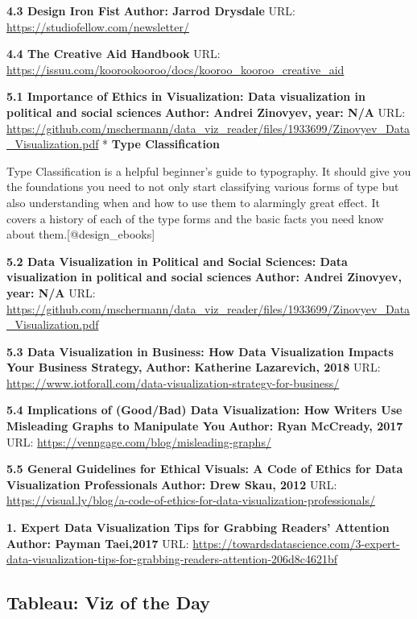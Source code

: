 \documentclass[]{book}
\theoremstyle{definition}
\theoremstyle{definition}
\theoremstyle{definition}
\theoremstyle{remark}
\begin{document}
\textbf{4.3 Design Iron Fist} \textbf{Author: Jarrod Drysdale} URL:
\url{https://studiofellow.com/newsletter/}

\textbf{4.4 The Creative Aid Handbook} URL:
\url{https://issuu.com/koorookooroo/docs/kooroo_kooroo_creative_aid}

\textbf{5.1 Importance of Ethics in Visualization: Data visualization in
political and social sciences} \textbf{Author: Andrei Zinovyev, year:
N/A} URL:
\url{https://github.com/mschermann/data_viz_reader/files/1933699/Zinovyev_Data_Visualization.pdf}
* \textbf{Type Classification}

Type Classification is a helpful beginner's guide to typography. It
should give you the foundations you need to not only start classifying
various forms of type but also understanding when and how to use them to
alarmingly great effect. It covers a history of each of the type forms
and the basic facts you need know about them.{[}@design\_ebooks{]}

\textbf{5.2 Data Visualization in Political and Social Sciences: Data
visualization in political and social sciences} \textbf{Author: Andrei
Zinovyev, year: N/A} URL:
\url{https://github.com/mschermann/data_viz_reader/files/1933699/Zinovyev_Data_Visualization.pdf}

\textbf{5.3 Data Visualization in Business: How Data Visualization
Impacts Your Business Strategy,} \textbf{Author: Katherine Lazarevich,
2018} URL:
\url{https://www.iotforall.com/data-visualization-strategy-for-business/}

\textbf{5.4 Implications of (Good/Bad) Data Visualization: How Writers
Use Misleading Graphs to Manipulate You} \textbf{Author: Ryan McCready,
2017} URL: \url{https://venngage.com/blog/misleading-graphs/}

\textbf{5.5 General Guidelines for Ethical Visuals: A Code of Ethics for
Data Visualization Professionals} \textbf{Author: Drew Skau, 2012} URL:
\url{https://visual.ly/blog/a-code-of-ethics-for-data-visualization-professionals/}

\textbf{1. Expert Data Visualization Tips for Grabbing Readers'
Attention} \textbf{Author: Payman Taei,2017} URL:
\url{https://towardsdatascience.com/3-expert-data-visualization-tips-for-grabbing-readers-attention-206d8c4621bf}

\subsection{Tableau: Viz of the Day}\label{tableau-viz-of-the-day}
\end{document}
